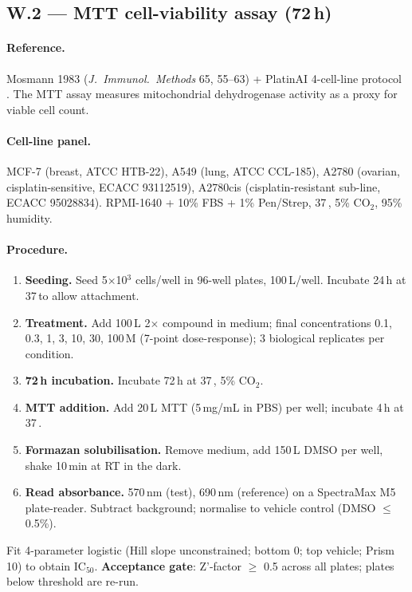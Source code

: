 \subsection{W.2 --- MTT cell-viability assay (72\,h)}
\label{appendix:W-mtt}

\paragraph{Reference.}
Mosmann 1983 (\emph{J.~Immunol.~Methods} 65, 55--63) +
PlatinAI 4-cell-line protocol
\citep{rusanov2025platinai}.  The MTT assay measures
mitochondrial dehydrogenase activity as a proxy for viable
cell count.

\paragraph{Cell-line panel.}
MCF-7 (breast, ATCC HTB-22), A549 (lung, ATCC CCL-185),
A2780 (ovarian, cisplatin-sensitive, ECACC 93112519),
A2780cis (cisplatin-resistant sub-line, ECACC 95028834).
RPMI-1640 + 10\% FBS + 1\% Pen/Strep, 37\,\textcelsius,
5\% CO$_2$, 95\% humidity.

\paragraph{Procedure.}
\begin{enumerate}
  \item \textbf{Seeding.}  Seed 5$\times$10$^3$ cells/well
        in 96-well plates, 100\,\textmu L/well.  Incubate
        24\,h at 37\,\textcelsius to allow attachment.
  \item \textbf{Treatment.}  Add 100\,\textmu L
        2$\times$ compound in medium; final concentrations
        0.1, 0.3, 1, 3, 10, 30, 100\,\textmu M
        (7-point dose-response); 3 biological replicates
        per condition.
  \item \textbf{72\,h incubation.}  Incubate 72\,h at
        37\,\textcelsius, 5\% CO$_2$.
  \item \textbf{MTT addition.}  Add 20\,\textmu L MTT
        (5\,mg/mL in PBS) per well; incubate 4\,h at
        37\,\textcelsius.
  \item \textbf{Formazan solubilisation.}  Remove medium,
        add 150\,\textmu L DMSO per well, shake 10\,min
        at RT in the dark.
  \item \textbf{Read absorbance.}  570\,nm (test),
        690\,nm (reference) on a SpectraMax M5
        plate-reader.  Subtract background; normalise to
        vehicle control (DMSO $\leq$ 0.5\%).
\end{enumerate}
Fit 4-parameter logistic (Hill slope unconstrained; bottom
0; top vehicle; Prism 10) to obtain IC$_{50}$.
\textbf{Acceptance gate}: Z'-factor $\geq$ 0.5 across all
plates; plates below threshold are re-run.

